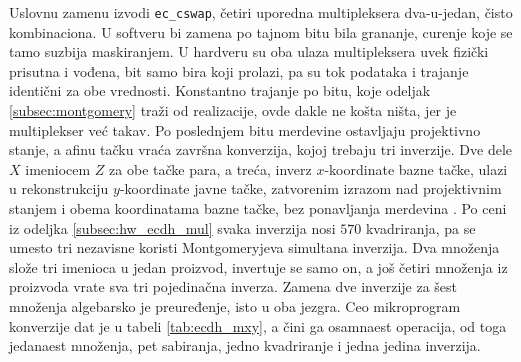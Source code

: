Uslovnu zamenu izvodi \texttt{ec\_cswap}, četiri uporedna multipleksera dva-u-jedan, čisto kombinaciona. U softveru bi zamena po tajnom bitu bila grananje, curenje koje se tamo suzbija maskiranjem. U hardveru su oba ulaza multipleksera uvek fizički prisutna i vođena, bit samo bira koji prolazi, pa su tok podataka i trajanje identični za obe vrednosti. Konstantno trajanje po bitu, koje odeljak \ref{subsec:montgomery} traži od realizacije, ovde dakle ne košta ništa, jer je multiplekser već takav.
\smallbreak
Po poslednjem bitu merdevine ostavljaju projektivno stanje, a afinu tačku vraća završna konverzija, kojoj trebaju tri inverzije. Dve dele $X$ imeniocem $Z$ za obe tačke para, a treća, inverz $x$-koordinate bazne tačke, ulazi u rekonstrukciju $y$-koordinate javne tačke, zatvorenim izrazom nad projektivnim stanjem i obema koordinatama bazne tačke, bez ponavljanja merdevina \cite{lopez_dahab, okeya_sakurai}. Po ceni iz odeljka \ref{subsec:hw_ecdh_mul} svaka inverzija nosi $570$ kvadriranja, pa se umesto tri nezavisne koristi Montgomeryjeva simultana inverzija. Dva množenja slože tri imenioca u jedan proizvod, invertuje se samo on, a još četiri množenja iz proizvoda vrate sva tri pojedinačna inverza. Zamena dve inverzije za šest množenja algebarsko je preuređenje, isto u oba jezgra. Ceo mikroprogram konverzije dat je u tabeli \ref{tab:ecdh_mxy}, a čini ga osamnaest operacija, od toga jedanaest množenja, pet sabiranja, jedno kvadriranje i jedna jedina inverzija.

